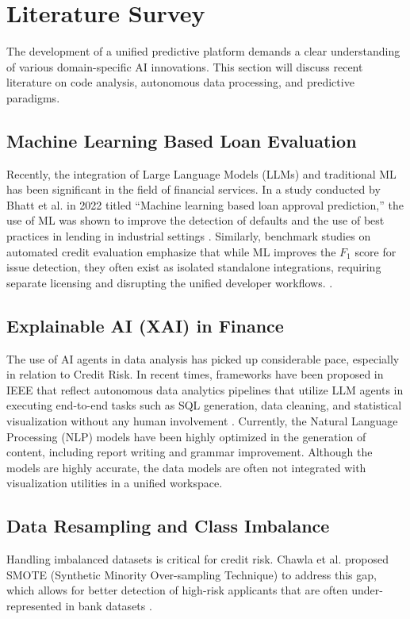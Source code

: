 \documentclass[conference]{IEEEtran}
\begin{document}
\section{Literature Survey}
The development of a unified predictive platform demands a clear understanding of various domain-specific AI innovations. This section will discuss recent literature on code analysis, autonomous data processing, and predictive paradigms.

\subsection{Machine Learning Based Loan Evaluation}
Recently, the integration of Large Language Models (LLMs) and traditional ML has been significant in the field of financial services. In a study conducted by Bhatt et al. in 2022 titled “Machine learning based loan approval prediction,” the use of ML was shown to improve the detection of defaults and the use of best practices in lending in industrial settings \cite{bhatt2022loan}. Similarly, benchmark studies on automated credit evaluation emphasize that while ML improves the $F_1$ score for issue detection, they often exist as isolated standalone integrations, requiring separate licensing and disrupting the unified developer workflows. \cite{hosmer2013}.

\subsection{Explainable AI (XAI) in Finance}
The use of AI agents in data analysis has picked up considerable pace, especially in relation to Credit Risk. In recent times, frameworks have been proposed in IEEE that reflect autonomous data analytics pipelines that utilize LLM agents in executing end-to-end tasks such as SQL generation, data cleaning, and statistical visualization without any human involvement
\cite{lundberg2017shap}. Currently, the Natural Language Processing (NLP) models have been highly optimized in the generation of content, including report writing and grammar improvement. Although the models are highly accurate, the data models are often not integrated with visualization utilities in a unified workspace.

\subsection{Data Resampling and Class Imbalance}
Handling imbalanced datasets is critical for credit risk. Chawla et al. proposed SMOTE (Synthetic Minority Over-sampling Technique) to address this gap, which allows for better detection of high-risk applicants that are often under-represented in bank datasets \cite{chawla2002smote}.
\end{document}
